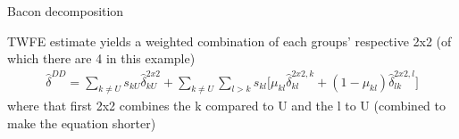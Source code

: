 \documentclass{beamer}
\begin{document}



	

\begin{frame}{Bacon decomposition}


TWFE estimate yields a weighted combination of each groups' respective 2x2 (of which there are 4 in this example)
\begin{eqnarray*}	
\widehat{\delta}^{DD} = \sum_{k \neq U} s_{kU}\widehat{\delta}_{kU}^{2x2} + \sum_{k \neq U} \sum_{l>k} s_{kl}  \bigg [ \mu_{kl}\widehat{\delta}_{kl}^{2x2,k} + (1-\mu_{kl}) \widehat{\delta}_{lk}^{2x2,l} \bigg]
\end{eqnarray*}where that first 2x2 combines the k compared to U and the l to U (combined to make the equation shorter)

\end{frame}
	
\end{document}

